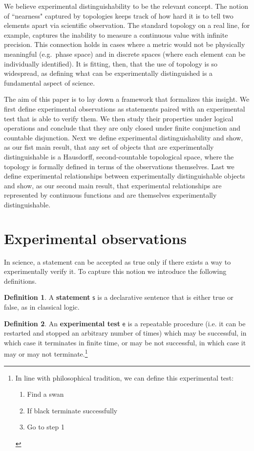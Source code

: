\documentclass[preprint]{elsarticle}
\theoremstyle{plain}%
\theoremstyle{definition}
\newtheorem{defn}{Definition}[section]
\theoremstyle{remark}
\begin{document}
We believe experimental distinguishability to be the relevant concept. The notion of ``nearness" captured by topologies keeps track of how hard it is to tell two elements apart via scientific observation. The standard topology on a real line, for example, captures the inability to measure a continuous value with infinite precision. This connection holds in cases where a metric would not be physically meaningful (e.g.~phase space) and in discrete spaces (where each element can be individually identified).  It is fitting, then, that the use of topology is so widespread, as defining what can be experimentally distinguished is a fundamental aspect of science.

The aim of this paper is to lay down a framework that formalizes this insight. We first define experimental observations as statements paired with an experimental test that is able to verify them. We then study their properties under logical operations and conclude that they are only closed under finite conjunction and countable disjunction. Next we define experimental distinguishability and show, as our fist main result, that any set of objects that are experimentally distinguishable is a Hausdorff, second-countable topological space, where the topology is formally defined in terms of the observations themselves. Last we define experimental relationships between experimentally distinguishable objects and show, as our second main result, that experimental relationships are represented by continuous functions and are themselves experimentally distinguishable.


\section{Experimental observations}

In science, a statement can be accepted as true only if there exists a way to experimentally verify it. To capture this notion we introduce the following definitions.

\begin{defn}
	A \textbf{statement} $\mathsf{s}$ is a declarative sentence that is either true or false, as in classical logic. 
\end{defn}

\begin{defn}
	An \textbf{experimental test} $\mathsf{e}$ is a repeatable procedure (i.e. it can be restarted and stopped an arbitrary number of times) which may be successful, in which case it terminates in finite time, or may be not successful, in which case it may or may not terminate.\footnote{In line with philosophical tradition\cite{mill,russell}, we can define this experimental test:
		\begin{enumerate}
			\item Find a swan
			\item If black terminate successfully
			\item Go to step 1
	\end{enumerate}}
\end{defn}
\end{document}
